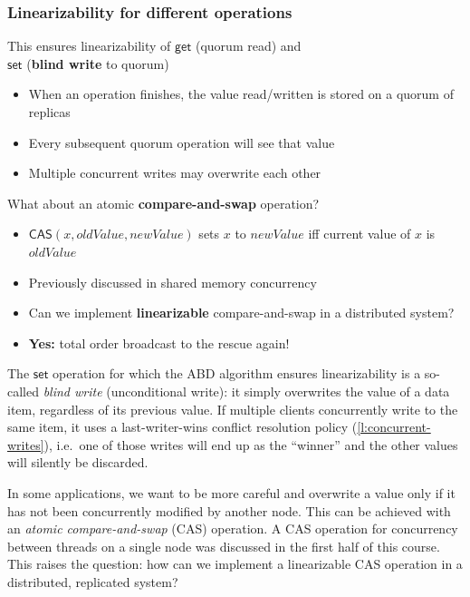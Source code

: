 \begin{frame}
    \label{s:cas-1}
    \frametitle{Linearizability for different operations}
    This ensures linearizability of $\mathsf{get}$ (quorum read) and\\$\mathsf{set}$ (\textbf{blind write} to quorum)\pause
    \begin{itemize}
        \item When an operation finishes, the value read/written is stored on a quorum of replicas
        \item Every subsequent quorum operation will see that value\pause
        \item Multiple concurrent writes may overwrite each other\\[1em]\pause
    \end{itemize}
    What about an atomic \textbf{compare-and-swap} operation?
    \begin{itemize}
        \item $\mathsf{CAS}(x, \mathit{oldValue}, \mathit{newValue})$ sets $x$ to $\mathit{newValue}$
            iff current value of $x$ is $\mathit{oldValue}$
        \item Previously discussed in shared memory concurrency\pause
        \item Can we implement \textbf{linearizable} compare-and-swap in a distributed system?\pause
        \item \textbf{Yes:} total order broadcast to the rescue again!
    \end{itemize}
\end{frame}
\label{l:cas-1}

The $\mathsf{set}$ operation for which the ABD algorithm ensures linearizability is a so-called \emph{blind write} (unconditional write): it simply overwrites the value of a data item, regardless of its previous value.
If multiple clients concurrently write to the same item, it uses a last-writer-wins conflict resolution policy (\autoref{l:concurrent-writes}), i.e.\ one of those writes will end up as the ``winner'' and the other values will silently be discarded.

In some applications, we want to be more careful and overwrite a value only if it has not been concurrently modified by another node.
This can be achieved with an \emph{atomic compare-and-swap} (CAS) operation.
A CAS operation for concurrency between threads on a single node was discussed in the first half of this course.
This raises the question: how can we implement a linearizable CAS operation in a distributed, replicated system?

